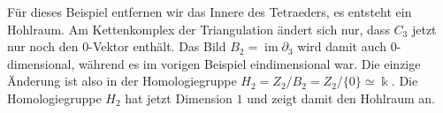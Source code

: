 \begin{beispiel}
Für dieses Beispiel entfernen wir das Innere des Tetraeders, es entsteht
ein Hohlraum.
Am Kettenkomplex der Triangulation ändert sich nur, dass $C_3$ jetzt 
nur noch den $0$-Vektor enthält.
Das Bild $B_2=\operatorname{im}\partial_3$ wird damit auch $0$-dimensional,
während es im vorigen Beispiel eindimensional war.
Die einzige Änderung ist also in der Homologiegruppe 
$H_2 = Z_2/B_2 = Z_2 / \{0\} \simeq \Bbbk$.
Die Homologiegruppe $H_2$ hat jetzt Dimension $1$ und zeigt damit den
Hohlraum an.
\end{beispiel}
